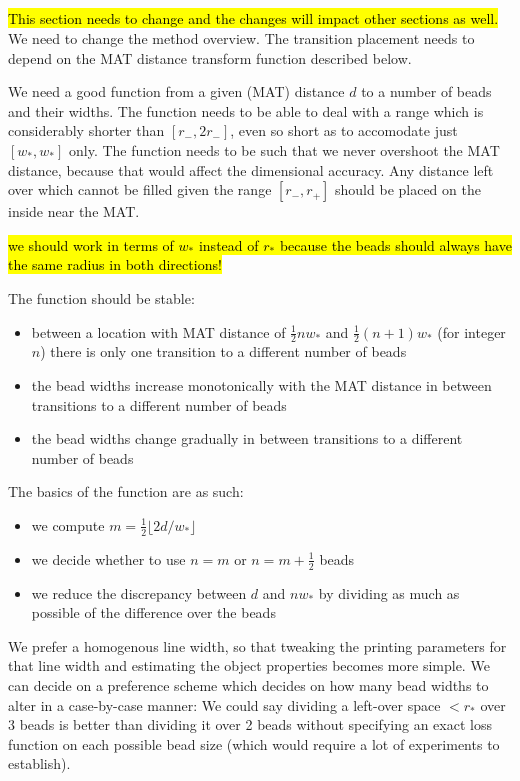 \subsection{}
\hl{This section needs to change and the changes will impact other sections as well.}
We need to change the method overview.
The transition placement needs to depend on the MAT distance transform function described below.

We need a good function from a given (MAT) distance $d$ to a number of beads and their widths.
The function needs to be able to deal with a range which is considerably shorter than $[r_-, 2r_-]$, even so short as to accomodate just $[w_*,w_*]$ only.
The function needs to be such that we never overshoot the MAT distance, because that would affect the dimensional accuracy.
Any distance left over which cannot be filled given the range $[r_-,r_+]$ should be placed on the inside near the MAT.

\hl{we should work in terms of $w_*$ instead of $r_*$ because the beads should always have the same radius in both directions!}

The function should be stable:
\begin{itemize}
\item between a location with MAT distance of $\frac12 nw_*$ and $\frac12 (n+1)w_*$ (for integer $n$) there is only one transition to a different number of beads
\item the bead widths increase monotonically with the MAT distance in between transitions to a different number of beads
\item the bead widths change gradually in between transitions to a different number of beads
\end{itemize}

The basics of the function are as such:
\begin{itemize}
\item we compute $m = \frac12 \lfloor 2 d / w_* \rfloor$
\item we decide whether to use $n = m$ or $n = m+\frac12$ beads
\item we reduce the discrepancy between $d$ and $nw_*$ by dividing as much as possible of the difference over the beads
\end{itemize}

We prefer a homogenous line width, so that tweaking the printing parameters for that line width and estimating the object properties becomes more simple.
We can decide on a preference scheme which decides on how many bead widths to alter in a case-by-case manner:
We could say dividing a left-over space $<r_*$ over 3 beads is better than dividing it over 2 beads without specifying an exact loss function on each possible bead size (which would require a lot of experiments to establish).





